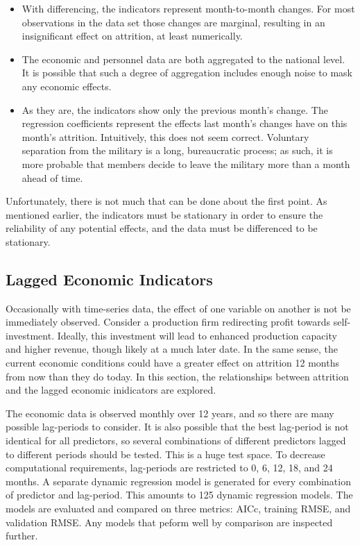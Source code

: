 \documentclass[12pt,letterpaper,toc=flat,oneside]{report}
\theoremstyle{definition}
\theoremstyle{definition}
\theoremstyle{definition}
\theoremstyle{remark}
\begin{document}
\begin{itemize}
\item
  With differencing, the indicators represent month-to-month changes.
  For most observations in the data set those changes are marginal,
  resulting in an insignificant effect on attrition, at least
  numerically.
\item
  The economic and personnel data are both aggregated to the national
  level. It is possible that such a degree of aggregation includes
  enough noise to mask any economic effects.
\item
  As they are, the indicators show only the previous month's change. The
  regression coefficients represent the effects last month's changes
  have on this month's attrition. Intuitively, this does not seem
  correct. Voluntary separation from the military is a long,
  bureaucratic process; as such, it is more probable that members decide
  to leave the military more than a month ahead of time.
\end{itemize}

Unfortunately, there is not much that can be done about the first point.
As mentioned earlier, the indicators must be stationary in order to
ensure the reliability of any potential effects, and the data must be
differenced to be stationary.

\hypertarget{lagged-economic-indicators}{%
\subsection{Lagged Economic
Indicators}\label{lagged-economic-indicators}}

Occasionally with time-series data, the effect of one variable on
another is not be immediately observed. Consider a production firm
redirecting profit towards self-investment. Ideally, this investment
will lead to enhanced production capacity and higher revenue, though
likely at a much later date. In the same sense, the current economic
conditions could have a greater effect on attrition 12 months from now
than they do today. In this section, the relationships between attrition
and the lagged economic inidicators are explored.

The economic data is observed monthly over 12 years, and so there are
many possible lag-periods to consider. It is also possible that the best
lag-period is not identical for all predictors, so several combinations
of different predictors lagged to different periods should be tested.
This is a huge test space. To decrease computational requirements,
lag-periods are restricted to 0, 6, 12, 18, and 24 months. A separate
dynamic regression model is generated for every combination of predictor
and lag-period. This amounts to 125 dynamic regression models. The
models are evaluated and compared on three metrics: AICc, training RMSE,
and validation RMSE. Any models that peform well by comparison are
inspected further.
\end{document}
